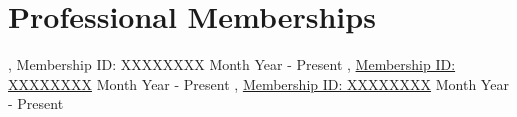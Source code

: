\section{\textbf{Professional Memberships}}
\vspace{-0.4mm}
\resumeSubHeadingListStart
{}
    {, Membership ID: XXXXXXXX}
    {Month Year - Present}
    {, \href{https://membership-certificate-link.com}{Membership ID: XXXXXXXX}}
    {Month Year - Present}
    {, \href{https://membership-certificate-link.com}{Membership ID: XXXXXXXX}}
    {Month Year - Present}

\resumeSubHeadingListEnd
\vspace{-6mm}